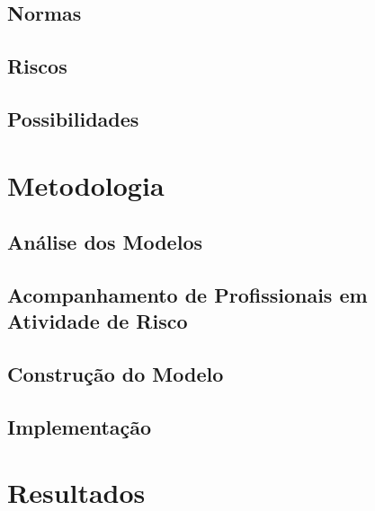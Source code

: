 \documentclass[openright]{normas-utf-tex} %
\begin{document}
	\section{Normas}

		


	\section{Riscos}

		

	\section{Possibilidades}

		


\chapter{Metodologia}
\label{chap:metod}

	

	\section{Análise dos Modelos}

		

	\section{Acompanhamento de Profissionais em Atividade de Risco}

		

	\section{Construção do Modelo}

		

	\section{Implementação}

		

\chapter{Resultados}
\label{chap:resul}
\end{document}
